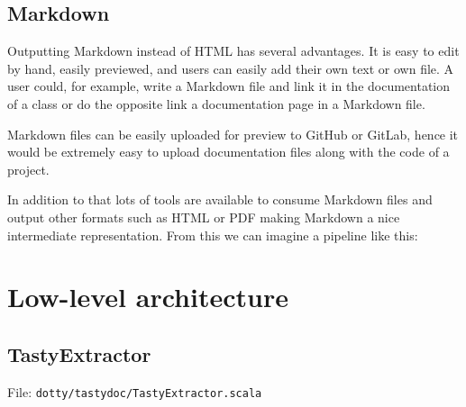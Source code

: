 \documentclass{report}
\begin{document}
\subsection{Markdown}
Outputting Markdown instead of HTML has several advantages. It is easy to edit by hand, easily previewed, and users can easily add their own text or own file. A user could, for example, write a Markdown file and link it in the documentation of a class or do the opposite link a documentation page in a Markdown file.

Markdown files can be easily uploaded for preview to GitHub or GitLab, hence it would be extremely easy to upload documentation files along with the code of a project.

In addition to that lots of tools are available to consume Markdown files and output other formats such as HTML or PDF making Markdown a nice intermediate representation. From this we can imagine a pipeline like this:
\begin{center}
\end{center}

\section{Low-level architecture}
\subsection{TastyExtractor}
File: \texttt{dotty/tastydoc/TastyExtractor.scala}
\end{document}
